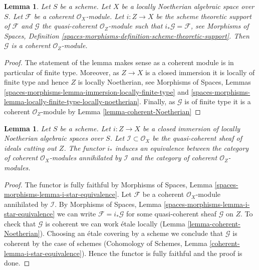 \documentclass{stacks-project}
\theoremstyle{plain}
\newtheorem{lemma}[subsection]{Lemma}
\theoremstyle{definition}
\theoremstyle{remark}
\numberwithin{equation}{subsection}
\begin{document}
\begin{lemma}
\label{lemma-coherent-support-closed}
Let $S$ be a scheme. Let $X$ be a locally Noetherian algebraic space over $S$.
Let $\mathcal{F}$ be a coherent $\mathcal{O}_X$-module. Let $i : Z \to X$
be the scheme theoretic support of $\mathcal{F}$ and $\mathcal{G}$
the quasi-coherent $\mathcal{O}_Z$-module such that
$i_*\mathcal{G} = \mathcal{F}$, see
Morphisms of Spaces, Definition
\ref{spaces-morphisms-definition-scheme-theoretic-support}.
Then $\mathcal{G}$ is a coherent $\mathcal{O}_Z$-module.
\end{lemma}

\begin{proof}
The statement of the lemma makes sense as a coherent module is in
particular of finite type. Moreover, as $Z \to X$ is a closed immersion
it is locally of finite type and hence $Z$ is locally Noetherian, see
Morphisms of Spaces, Lemmas
\ref{spaces-morphisms-lemma-immersion-locally-finite-type} and
\ref{spaces-morphisms-lemma-locally-finite-type-locally-noetherian}.
Finally, as $\mathcal{G}$ is of finite type it is a coherent
$\mathcal{O}_Z$-module by
Lemma \ref{lemma-coherent-Noetherian}
\end{proof}

\begin{lemma}
\label{lemma-i-star-equivalence}
Let $S$ be a scheme. Let $i : Z \to X$ be a closed immersion of locally
Noetherian algebraic spaces over $S$.
Let $\mathcal{I} \subset \mathcal{O}_X$ be the quasi-coherent sheaf of ideals
cutting out $Z$. The functor $i_*$ induces an equivalence between the
category of coherent $\mathcal{O}_X$-modules annihilated by $\mathcal{I}$
and the category of coherent $\mathcal{O}_Z$-modules.
\end{lemma}

\begin{proof}
The functor is fully faithful by
Morphisms of Spaces, Lemma \ref{spaces-morphisms-lemma-i-star-equivalence}.
Let $\mathcal{F}$ be a coherent $\mathcal{O}_X$-module
annihilated by $\mathcal{I}$. By
Morphisms of Spaces, Lemma \ref{spaces-morphisms-lemma-i-star-equivalence}
we can write $\mathcal{F} = i_*\mathcal{G}$ for some quasi-coherent
sheaf $\mathcal{G}$ on $Z$. To check that $\mathcal{G}$ is coherent
we can work \'etale locally (Lemma \ref{lemma-coherent-Noetherian}).
Choosing an \'etale covering by a scheme we conclude that
$\mathcal{G}$ is coherent by the case of schemes
(Cohomology of Schemes, Lemma \ref{coherent-lemma-i-star-equivalence}).
Hence the functor is fully faithful and the proof is done.
\end{proof}
\end{document}
